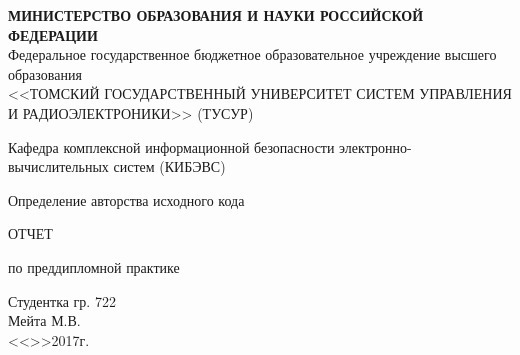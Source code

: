 \newpage
{}

\begin{center}
 \textbf{МИНИСТЕРСТВО ОБРАЗОВАНИЯ И НАУКИ РОССИЙСКОЙ ФЕДЕРАЦИИ}\\
 Федеральное государственное бюджетное образовательное учреждение высшего образования\\
 <<ТОМСКИЙ ГОСУДАРСТВЕННЫЙ УНИВЕРСИТЕТ СИСТЕМ УПРАВЛЕНИЯ И РАДИОЭЛЕКТРОНИКИ>> (ТУСУР)\\
\end{center} 

\vfill

\begin{center}
Кафедра комплексной информационной безопасности электронно-вычислительных систем (КИБЭВС)\\
\end{center}

\vfill


\begin{center}
Определение авторства исходного кода

ОТЧЕТ

по преддипломной практике
\end{center}


\vfill

\begin{flushright}
\begin{minipage}{0.45\textwidth}
 \begin{flushleft}
  Студентка гр. 722 \\
  \underline{\hspace{3cm}} Мейта М.В. \\
  <<\underline{\hspace{1cm}}>>\underline{\hspace{3cm}}2017г.\\
 \end{flushleft}
\end{minipage}
\end{flushright}



